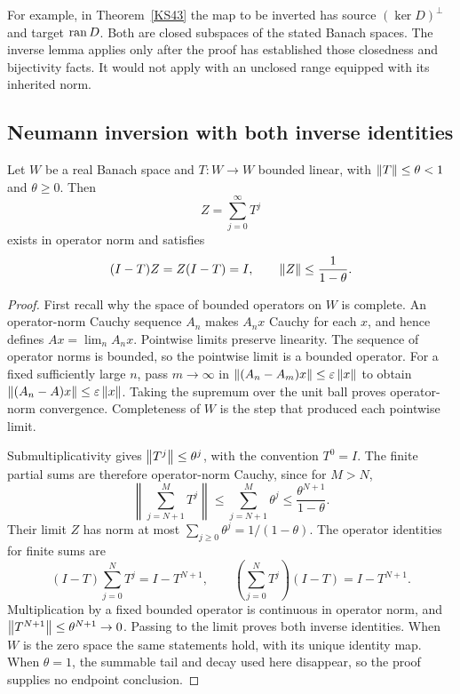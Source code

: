 For example, in Theorem~\ref{KS43} the map to be inverted has source \((\ker D)^\perp\) and target \(\operatorname{ran} D\). Both are closed subspaces of the stated Banach spaces. The inverse lemma applies only after the proof has established those closedness and bijectivity facts. It would not apply with an unclosed range equipped with its inherited norm.

\subsection{Neumann inversion with both inverse identities}
\begin{lemma}\label{lem:neumann-tool}
Let \(W\) be a real Banach space and \(T:W\to W\) bounded linear, with \(\left\lVert T\right\rVert\le\theta<1\) and \(\theta\ge0\). Then
\[
 Z=\sum_{j=0}^{\infty}T^j
\]
exists in operator norm and satisfies
\[
 (I-T)Z=Z(I-T)=I,\qquad \left\lVert Z\right\rVert\le\frac1{1-\theta}.
\]
\end{lemma}
\begin{proof}
First recall why the space of bounded operators on \(W\) is complete. An operator-norm Cauchy sequence \(A_n\) makes \(A_nx\) Cauchy for each \(x\), and hence defines \(Ax=\lim_nA_nx\). Pointwise limits preserve linearity. The sequence of operator norms is bounded, so the pointwise limit is a bounded operator. For a fixed sufficiently large \(n\), pass \(m\to\infty\) in \(\left\lVert(A_n-A_m)x\right\rVert\le\varepsilon\left\lVert x\right\rVert\) to obtain \(\left\lVert(A_n-A)x\right\rVert\le\varepsilon\left\lVert x\right\rVert\). Taking the supremum over the unit ball proves operator-norm convergence. Completeness of \(W\) is the step that produced each pointwise limit.

Submultiplicativity gives \(\left\lVert T^j\right\rVert\le\theta^j\), with the convention \(T^0=I\). The finite partial sums are therefore operator-norm Cauchy, since for \(M>N\),
\[
 \left\|\sum_{j=N+1}^{M}T^j\right\|
 \le\sum_{j=N+1}^{M}\theta^j\le\frac{\theta^{N+1}}{1-\theta}.
\]
Their limit \(Z\) has norm at most \(\sum_{j\ge0}\theta^j=1/(1-\theta)\). The operator identities for finite sums are
\[
 (I-T)\sum_{j=0}^{N}T^j=I-T^{N+1},\qquad
 \left(\sum_{j=0}^{N}T^j\right)(I-T)=I-T^{N+1}.
\]
Multiplication by a fixed bounded operator is continuous in operator norm, and \(\left\lVert T^{N+1}\right\rVert\le\theta^{N+1}\to0\). Passing to the limit proves both inverse identities. When \(W\) is the zero space the same statements hold, with its unique identity map. When \(\theta=1\), the summable tail and decay used here disappear, so the proof supplies no endpoint conclusion.
\end{proof}

